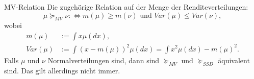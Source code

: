 \begin{karte}{MV-Relation}
Die zugehörige Relation auf der Menge der Renditeverteilungen: 
\[ \mu \succeq_{MV} \nu :\Leftrightarrow m(\mu) \geq m(\nu) \text{ und } Var(\mu) \leq Var(\nu), \]
wobei 
\begin{align*}
    m(\mu) &:= \int x \mu(dx), \\
    Var(\mu) &:= \int (x - m(\mu))^2 \mu(dx) = \int x^2 \mu(dx) - m(\mu)^2.
\end{align*}
Falls \(\mu\) und \(\nu\) Normalverteilungen sind, dann sind \(\succeq_{MV}\) 
und \(\succeq_{SSD}\) äquivalent sind. Das gilt allerdings nicht immer.
\end{karte}

\begin{karte}{}

\end{karte}

\begin{karte}{}

\end{karte}

\begin{karte}{}

\end{karte}

\begin{karte}{}

\end{karte}

\begin{karte}{}

\end{karte}